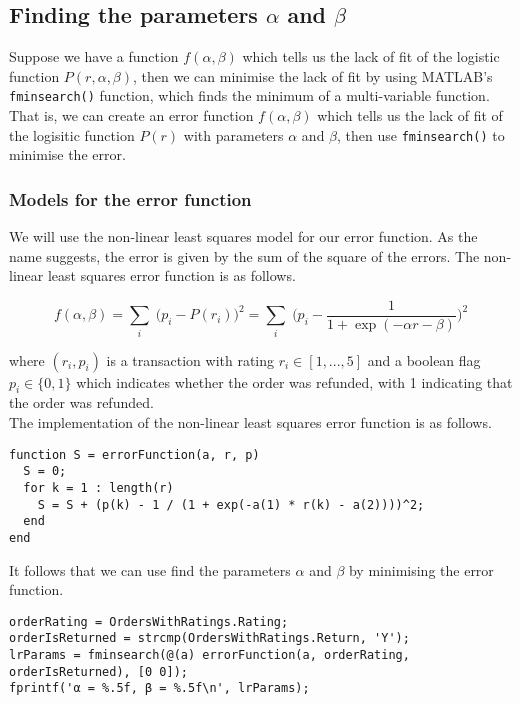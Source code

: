 \subsection{Finding the parameters $\alpha$ and $\beta$}
Suppose we have a function $f(\alpha, \beta)$ which tells us the lack of fit of the logistic function $P(r, \alpha, \beta)$, then we can minimise the lack of fit by using MATLAB's \lstinline|fminsearch()| function, which finds the minimum of a multi-variable function. That is, we can create an error function $f(\alpha, \beta)$ which tells us the lack of fit of the logisitic function $P(r)$ with parameters $\alpha$ and $\beta$, then use \lstinline|fminsearch()| to minimise the error.

\subsubsection{Models for the error function}
We will use the non-linear least squares model for our error function. As the name suggests, the error is given by the sum of the square of the errors. The non-linear least squares error function is as follows.

$$f(\alpha, \beta) = \sum_i \; \Big(p_i - P(r_i)\Big)^2 = \sum_i \; \Bigg(p_i - \frac{1}{1 + \exp(-\alpha r - \beta)}\Bigg)^2$$

\noindent
where $(r_i, p_i)$ is a transaction with rating $r_i \in [1, ..., 5]$ and a boolean flag $p_i \in \{0, 1\}$ which indicates whether the order was refunded, with 1 indicating that the order was refunded. \\

\noindent
The implementation of the non-linear least squares error function is as follows.

\begin{lstlisting}
function S = errorFunction(a, r, p)
  S = 0;
  for k = 1 : length(r)
    S = S + (p(k) - 1 / (1 + exp(-a(1) * r(k) - a(2))))^2;
  end
end
\end{lstlisting}

\noindent
It follows that we can use find the parameters $\alpha$ and $\beta$ by minimising the error function.

\begin{lstlisting}
orderRating = OrdersWithRatings.Rating;
orderIsReturned = strcmp(OrdersWithRatings.Return, 'Y');
lrParams = fminsearch(@(a) errorFunction(a, orderRating, orderIsReturned), [0 0]);
fprintf('α = %.5f, β = %.5f\n', lrParams); 
\end{lstlisting}

